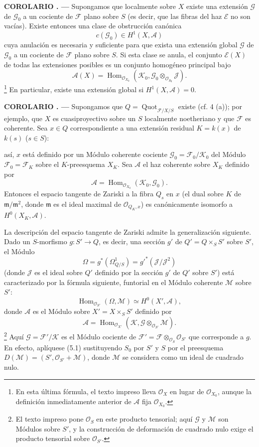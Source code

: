 \documentclass[11pt,twoside,openany]{book}
\numberwithin{equation}{section}
\newcommand{\src}[1]{%
  \phantomsection\hypertarget{src:#1}{}%
  \marginpar{\raggedleft\footnotesize\sffamily #1}%
}
\theoremstyle{plain}
\theoremstyle{definition}
\theoremstyle{remark}
\newcommand{\result}[2]{%
  \par\medskip\noindent\textbf{#1%
  \if\relax\detokenize{#2}\relax\else\space#2\fi. ---}\enspace
}
\newcommand{\FgaUnitKey}{frontmatter}
\renewcommand{\src}[1]{%
  \phantomsection\hypertarget{src:\FgaUnitKey:#1}{}%
  \marginpar{\raggedleft\footnotesize\sffamily #1}%
}
\theoremstyle{plain}
\theoremstyle{definition}
\theoremstyle{remark}
\begin{document}
\result{COROLARIO}{5.2} Supongamos que localmente sobre $X$ existe una
extensión $\mathcal G$ de $\mathcal G_0$ a un cociente de $\mathcal F$ plano
sobre $S$ (es decir, que las fibras del haz $\mathcal E$ no son vacías).
Existe entonces una clase de obstrucción canónica
\[
c(\mathcal G_0)\in H^1(X,\mathcal A)
\]
cuya anulación es necesaria y suficiente para que exista una extensión global
$\mathcal G$ de $\mathcal G_0$ a un cociente de $\mathcal F$ plano sobre $S$.
Si esta clase se anula, el conjunto $\mathcal E(X)$ de todas las extensiones
posibles es un conjunto homogéneo principal bajo
\[
\mathcal A(X)=\operatorname{Hom}_{\mathcal O_{X_0}}
(\mathcal K_0,\mathcal G_0\otimes_{\mathcal O_{S_0}}\mathcal J).
\]
\footnote{En esta última fórmula, el texto impreso lleva $\mathcal O_X$ en
lugar de $\mathcal O_{X_0}$, aunque la definición inmediatamente anterior de
$\mathcal A$ fija $\mathcal O_{X_0}$.}
En particular, existe una extensión global si $H^1(X,\mathcal A)=0$.

\result{COROLARIO}{5.3} Supongamos que
$Q=\operatorname{Quot}_{\mathcal F/X/S}$ existe (cf. 4 (a)); por ejemplo, que
$X$ es cuasiproyectivo sobre un $S$ localmente noetheriano y que $\mathcal F$
es coherente. Sea $x\in Q$ correspondiente a una extensión residual
$K=k(x)$ de $k(s)$ ($s\in S$):
\src{270}
así, $x$ está definido por un Módulo coherente cociente
$\mathcal G_0=\mathcal F_0/\mathcal K_0$ del Módulo
$\mathcal F_0=\mathcal F_K$ sobre el $K$-preesquema $X_K$. Sea $\mathcal A$
el haz coherente sobre $X_K$ definido por
\[
\mathcal A=\operatorname{Hom}_{\mathcal O_{X_0}}(\mathcal K_0,\mathcal G_0).
\]
Entonces el espacio tangente de Zariski a la fibra $Q_s$ en $x$ (el dual
sobre $K$ de $\mathfrak m/\mathfrak m^2$, donde $\mathfrak m$ es el ideal
maximal de $\mathcal O_{Q_K,x}$) es canónicamente isomorfo a
$H^0(X_K,\mathcal A)$.

La descripción del espacio tangente de Zariski admite la generalización
siguiente. Dado un $S$-morfismo $g:S'\longrightarrow Q$, es decir, una sección
$g'$ de $Q'=Q\times_SS'$ sobre $S'$, el Módulo
\[
\Omega=g^*(\Omega^1_{Q/S})=g'^*(\mathcal J/\mathcal J^2)
\]
(donde $\mathcal J$ es el ideal sobre $Q'$ definido por la sección $g'$ de
$Q'$ sobre $S'$) está caracterizado por la fórmula siguiente, funtorial en el
Módulo coherente $\mathcal M$ sobre $S'$:
\[
\operatorname{Hom}_{\mathcal O_{S'}}(\Omega,\mathcal M)
\simeq H^0(X',\mathcal A),
\]
donde $\mathcal A$ es el Módulo sobre $X'=X\times_SS'$ definido por
\[
\mathcal A=\operatorname{Hom}_{\mathcal O_{X'}}
(\mathcal K,\mathcal G\otimes_{\mathcal O_{S'}}\mathcal M).
\]
\footnote{El texto impreso pone $\mathcal O_S$ en este producto tensorial;
aquí $\mathcal G$ y $\mathcal M$ son Módulos sobre $S'$, y la construcción de
deformación de cuadrado nulo exige el producto tensorial sobre
$\mathcal O_{S'}$.}
Aquí $\mathcal G=\mathcal F'/\mathcal K$ es el Módulo cociente de
$\mathcal F'=\mathcal F\otimes_{\mathcal O_S}\mathcal O_{S'}$ que corresponde
a $g$. En efecto, aplíquese (5.1) sustituyendo $S_0$ por $S'$ y $S$ por el
preesquema $D(\mathcal M)=(S',\mathcal O_{S'}+\mathcal M)$, donde
$\mathcal M$ se considera como un ideal de cuadrado nulo.
\end{document}
